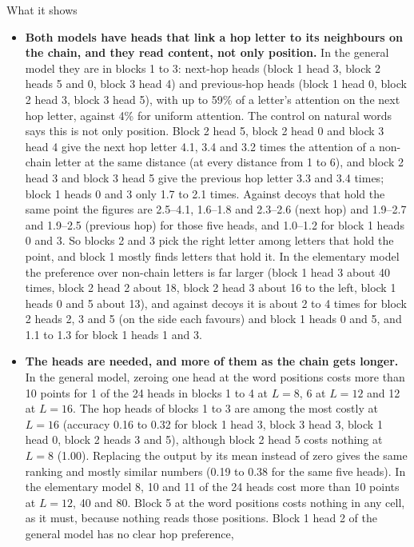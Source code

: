 \documentclass[paper=a4,fontsize=11pt,DIV=11,parskip=half,headings=small,numbers=noendperiod]{scrartcl}
\DeclareRobustCommand{\lead}[1]{\textsf{\bfseries\color{accent}#1}}
\begin{document}
\begin{findbox}{What it shows}
\begin{itemize}
\item \lead{Both models have heads that link a hop letter to its neighbours on the chain, and they read content,
  not only position.} In the general model they are in blocks 1 to 3: next-hop heads (block 1 head 3, block 2
  heads 5 and 0, block 3 head 4) and previous-hop heads (block 1 head 0, block 2 head 3, block 3 head 5), with
  up to 59\% of a letter’s attention on the next hop letter, against 4\% for uniform attention. The control on
  natural words says this is not only position. Block 2 head 5, block 2 head 0 and block 3 head 4 give the next
  hop letter 4.1, 3.4 and 3.2 times the attention of a non-chain letter at the same distance (at every distance
  from 1 to 6), and block 2 head 3 and block 3 head 5 give the previous hop letter 3.3 and 3.4 times; block 1
  heads 0 and 3 only 1.7 to 2.1 times. Against decoys that hold the same point the figures are 2.5–4.1, 1.6–1.8
  and 2.3–2.6 (next hop) and 1.9–2.7 and 1.9–2.5 (previous hop) for those five heads, and 1.0–1.2 for block 1
  heads 0 and 3. So blocks 2 and 3 pick the right letter among letters that hold the point, and block 1 mostly
  finds letters that hold it. In the elementary model the preference over non-chain letters is far larger (block
  1 head 3 about 40 times, block 2 head 2 about 18, block 2 head 3 about 16 to the left, block 1 heads 0 and 5
  about 13), and against decoys it is about 2 to 4 times for block 2 heads 2, 3 and 5 (on the side each favours)
  and block 1 heads 0 and 5, and 1.1 to 1.3 for block 1 heads 1 and 3.
\item \lead{The heads are needed, and more of them as the chain gets longer.} In the general model, zeroing one
  head at the word positions costs more than 10 points for 1 of the 24 heads in blocks 1 to 4 at $L=8$, 6 at
  $L=12$ and 12 at $L=16$. The hop heads of blocks 1 to 3 are among the most costly at $L=16$ (accuracy 0.16 to
  0.32 for block 1 head 3, block 3 head 3, block 1 head 0, block 2 heads 3 and 5), although block 2 head 5 costs
  nothing at $L=8$ (1.00). Replacing the output by its mean instead of zero gives the same ranking and mostly
  similar numbers (0.19 to 0.38 for the same five heads). In the elementary model 8, 10 and 11 of the 24 heads
  cost more than 10 points at $L=12$, 40 and 80. Block 5 at the word positions costs nothing in any cell, as it
  must, because nothing reads those positions. Block 1 head 2 of the general model has no clear hop preference,

\end{itemize}
\end{findbox}
\end{document}
